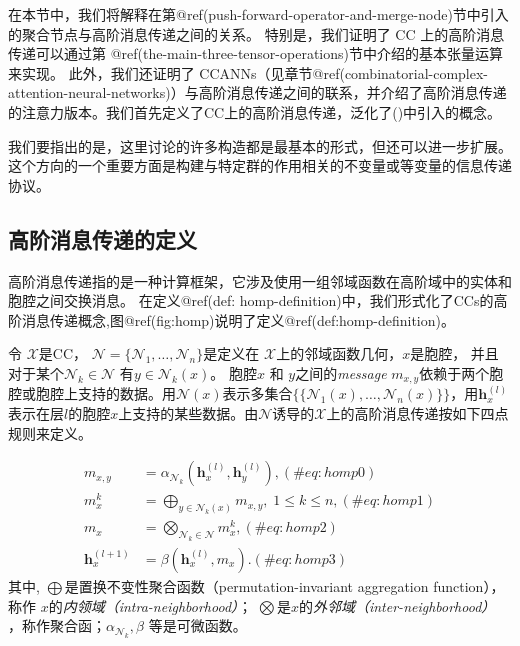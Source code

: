 \documentclass[
  12pt,
]{krantz}
\begin{document}
在本节中，我们将解释在第@ref(push-forward-operator-and-merge-node)节中引入的聚合节点与高阶消息传递之间的关系。
特别是，我们证明了 CC 上的高阶消息传递可以通过第
@ref(the-main-three-tensor-operations)节中介绍的基本张量运算来实现。
此外，我们还证明了
CCANNs（见章节@ref(combinatorial-complex-attention-neural-networks)）与高阶消息传递之间的联系，并介绍了高阶消息传递的注意力版本。我们首先定义了CC上的高阶消息传递，泛化了()中引入的概念。

我们要指出的是，这里讨论的许多构造都是最基本的形式，但还可以进一步扩展。这个方向的一个重要方面是构建与特定群的作用相关的不变量或等变量的信息传递协议。

\subsection{高阶消息传递的定义}\label{definition-of-higher-order-message-passing}

高阶消息传递指的是一种计算框架，它涉及使用一组邻域函数在高阶域中的实体和胞腔之间交换消息。
在定义@ref(def:
homp-definition)中，我们形式化了CCs的高阶消息传递概念,图@ref(fig:homp)说明了定义@ref(def:homp-definition)。

\label{homp-definition}
令 \(\mathcal{X}\)是CC，
\(\mathcal{N}=\{ \mathcal{N}_1,\ldots,\mathcal{N}_n\}\)是定义在
\(\mathcal{X}\)上的邻域函数几何，\(x\)是胞腔，
并且对于某个\(\mathcal{N}_k \in \mathcal{N}\)
有\(y\in \mathcal{N}_k(x)\)。 胞腔\(x\) 和 \(y\)之间的\emph{message}
\(m_{x,y}\)依赖于两个胞腔或胞腔上支持的数据。用\(\mathcal{N}(x)\)表示多集合\(\{\!\!\{ \mathcal{N}_1(x) , \ldots , \mathcal{N}_n (x) \}\!\!\}\)，用\(\mathbf{h}_x^{(l)}\)表示在层\(l\)的胞腔\(x\)上支持的某些数据。由\(\mathcal{N}\)诱导的\(\mathcal{X}\)上的高阶消息传递按如下四点规则来定义。

\begin{align}
m_{x,y} &= \alpha_{\mathcal{N}_k}(\mathbf{h}_x^{(l)},\mathbf{h}_y^{(l)}), (\#eq:homp0) \\
m_{x}^k &=  \bigoplus_{y \in \mathcal{N}_k(x)}  m_{x,y}, \; 1\leq k \leq n, (\#eq:homp1) \\
m_{x} &=  \bigotimes_{ \mathcal{N}_k \in \mathcal{N} } m_x^k, (\#eq:homp2) \\
\mathbf{h}_x^{(l+1)} &= \beta (\mathbf{h}_x^{(l)}, m_x).
(\#eq:homp3)
\end{align} 其中,
\(\bigoplus\)是置换不变性聚合函数（permutation-invariant aggregation
function），称作 \(x\)的\emph{内领域（intra-neighborhood）}；
\(\bigotimes\)是\(x\)的\emph{外邻域（inter-neighborhood）}
，称作聚合函；\(\alpha_{\mathcal{N}_k},\beta\) 等是可微函数。
\end{document}
